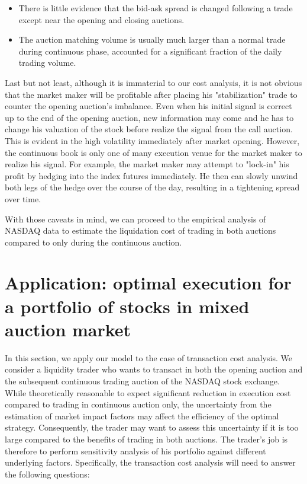 \begin{itemize}
  \item There is little evidence that the bid-ask spread is changed following a trade except near the opening and closing auctions.
  \item The auction matching volume is usually much larger than a normal trade during continuous phase, accounted for a significant fraction of the daily trading volume.
\end{itemize}

Last but not least, although it is immaterial to our cost analysis, it is not obvious that the market maker will be profitable after placing his "stabilization" trade to counter the opening auction's imbalance. Even when his initial signal is correct up to the end of the opening auction, new information may come and he has to change his valuation of the stock before realize the signal from the call auction. This is evident in the high volatility immediately after market opening. However, the continuous book is only one of many execution venue for the market maker to realize his signal. For example, the market maker may attempt to "lock-in" his profit by hedging into the index futures immediately. He then can slowly unwind both legs of the hedge over the course of the day, resulting in a tightening spread over time.

With those caveats in mind, we can proceed to the empirical analysis of NASDAQ data to estimate the liquidation cost of trading in both auctions compared to only during the continuous auction.

\section{Application: optimal execution for a portfolio of stocks in mixed auction market}\label{sec:EmpiricalAnalysis}

In this section, we apply our model to the case of transaction cost analysis. We consider a liquidity trader who wants to transact in both the opening auction and the subsequent continuous trading auction of the NASDAQ stock exchange. While theoretically reasonable to expect significant reduction in execution cost compared to trading in continuous auction only, the uncertainty from the estimation of market impact factors may affect the efficiency of the optimal strategy. Consequently, the trader may want to assess this uncertainty if it is too large compared to the benefits of trading in both auctions. The trader's job is therefore to perform sensitivity analysis of his portfolio against different underlying factors. Specifically, the transaction cost analysis will need to answer the following questions:

